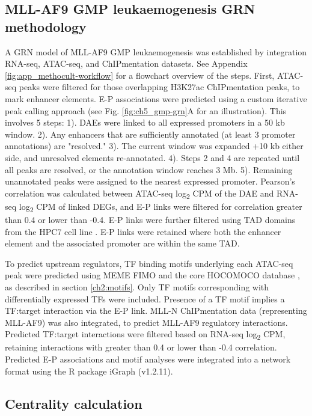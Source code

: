 \subsection{\label{ch2:ma9-grn}MLL-AF9 GMP leukaemogenesis GRN methodology}

A GRN model of MLL-AF9 GMP leukaemogenesis was established by integration RNA-seq, ATAC-seq, and ChIPmentation datasets. See Appendix \ref{fig:app_methocult-workflow} for a flowchart overview of the steps. First, ATAC-seq peaks were filtered for those overlapping H3K27ac ChIPmentation peaks, to mark enhancer elements. E-P associations were predicted using a custom iterative peak calling approach (see Fig. \ref{fig:ch5_gmp-grn}A for an illustration). This involves 5 steps: 1). DAEs were linked to all expressed promoters in a 50 kb window. 2). Any enhancers that are sufficiently annotated (at least 3 promoter annotations) are "resolved." 3). The current window was expanded +10 kb either side, and unresolved elements re-annotated. 4). Steps 2 and 4 are repeated until all peaks are resolved, or the annotation window reaches 3 Mb. 5). Remaining unannotated peaks were assigned to the nearest expressed promoter. Pearson's correlation was calculated between ATAC-seq log\textsubscript{2} CPM of the DAE and RNA-seq log\textsubscript{2} CPM of linked DEGs, and E-P links were filtered for correlation greater than 0.4 or lower than -0.4. E-P links were further filtered using TAD domains from the HPC7 cell line \citep{pinto_do_o_expression_1998}. E-P links were retained where both the enhancer element and the associated promoter are within the same TAD.

To predict upstream regulators, TF binding motifs underlying each ATAC-seq peak were predicted using MEME FIMO \citep{grant_fimo_2011} and the core HOCOMOCO database \citep{kulakovskiy_hocomoco_2018}, as described in section \ref{ch2:motifs}. Only TF motifs corresponding with differentially expressed TFs were included. Presence of a TF motif implies a TF:target interaction via the E-P link. MLL-N ChIPmentation data (representing MLL-AF9) was also integrated, to predict MLL-AF9 regulatory interactions. Predicted TF:target interactions were filtered based on RNA-seq log\textsubscript{2} CPM, retaining interactions with greater than 0.4 or lower than -0.4 correlation. Predicted E-P associations and motif analyses were integrated into a network format using the R package iGraph (v1.2.11). 

\subsection{\label{ch2:centrality}Centrality calculation}

